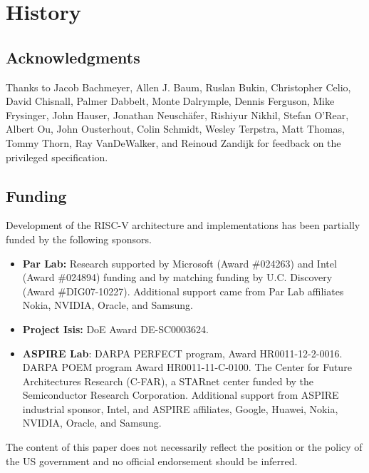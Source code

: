 \chapter{History}

\section*{Acknowledgments}

Thanks to Jacob Bachmeyer,
Allen J. Baum, Ruslan Bukin, Christopher Celio, David
Chisnall, Palmer Dabbelt, Monte Dalrymple, Dennis Ferguson, Mike
Frysinger, John Hauser, Jonathan Neusch{\"a}fer, Rishiyur Nikhil, Stefan O'Rear,
Albert Ou, John Ousterhout, Colin Schmidt, Wesley Terpstra, Matt
Thomas, Tommy Thorn, Ray VanDeWalker, and Reinoud Zandijk for feedback
on the privileged specification.

\section{Funding}

Development of the RISC-V architecture and implementations has been
partially funded by the following sponsors.
\begin{itemize}
\item {\bf Par Lab:} Research supported by Microsoft (Award \#024263)
  and Intel (Award \#024894) funding and by matching funding by
  U.C. Discovery (Award \#DIG07-10227). Additional support came from
  Par Lab affiliates Nokia, NVIDIA, Oracle, and Samsung.

\item {\bf Project Isis:} DoE Award DE-SC0003624.

\item {\bf ASPIRE Lab}: DARPA PERFECT program, Award HR0011-12-2-0016.
  DARPA POEM program Award HR0011-11-C-0100.  The Center for Future
  Architectures Research (C-FAR), a STARnet center funded by the
  Semiconductor Research Corporation.  Additional support from ASPIRE
  industrial sponsor, Intel, and ASPIRE affiliates, Google, Huawei,
  Nokia, NVIDIA, Oracle, and Samsung.
\end{itemize}

The content of this paper does not necessarily reflect the position or the
policy of the US government and no official endorsement should be
inferred. 
